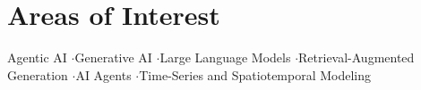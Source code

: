 \documentclass[a4paper, 10.5pt]{article}
\begin{document}
\section{Areas of Interest}

{\small Agentic AI \enspace$\cdot$\enspace Generative AI \enspace$\cdot$\enspace Large Language Models \enspace$\cdot$\enspace Retrieval-Augmented Generation \enspace$\cdot$\enspace AI Agents \enspace$\cdot$\enspace Time-Series and Spatiotemporal Modeling}
\end{document}
